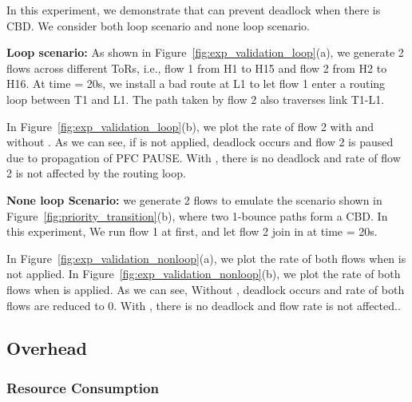 In this experiment, we demonstrate that \sysname{} can prevent deadlock when there is CBD. We consider both loop scenario and none loop scenario.

\textbf{Loop scenario:} As shown in Figure~\ref{fig:exp_validation_loop}(a), we generate 2 flows across different ToRs, i.e., flow 1 from H1 to H15 and flow 2 from H2 to H16. At time = 20s, we install a bad route at L1 to let flow 1 enter a routing loop between T1 and L1. The path taken by flow 2 also traverses link T1-L1. 

In Figure~\ref{fig:exp_validation_loop}(b), we plot the rate of flow 2 with and without \sysname{}. As we can see, if \sysname{} is not applied, deadlock occurs and flow 2 is paused due to propagation of PFC PAUSE. With \sysname{}, there is no deadlock and rate of flow 2 is not affected by the routing loop.

\textbf{None loop Scenario:} we generate 2 flows to emulate the scenario shown in Figure~\ref{fig:priority_transition}(b), where two 1-bounce paths form a CBD. In this experiment, We run flow 1 at first, and let flow 2 join in at time = 20s. 

In Figure~\ref{fig:exp_validation_nonloop}(a), we plot the rate of both flows when \sysname{} is not applied. In Figure~\ref{fig:exp_validation_nonloop}(b), we plot the rate of both flows when \sysname{} is applied. As we can see,
Without \sysname{}, deadlock occurs and rate of both flows are reduced to 0. With \sysname{}, there is no deadlock and flow rate is not affected..

\subsection{Overhead}\label{subsec:exp_overhead}

\subsubsection{Resource Consumption}\label{subsec:exp_resourceconsump}

